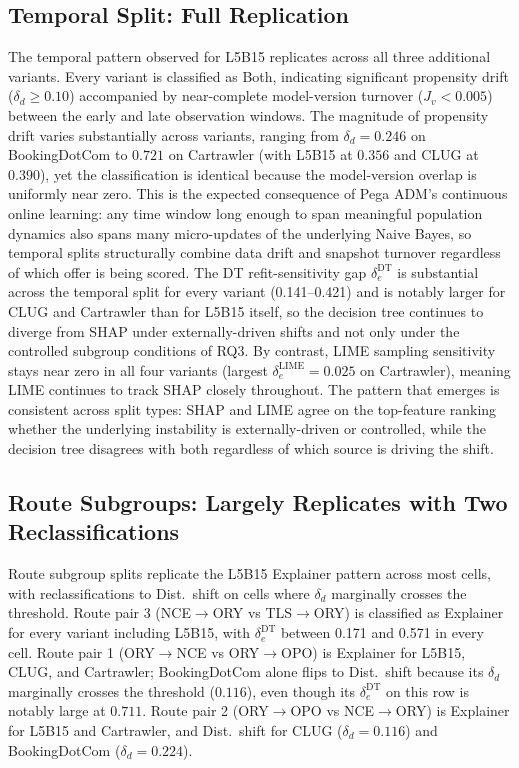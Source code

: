 \documentclass[oneside]{memoir} %
\begin{document}
\subsection{Temporal Split: Full Replication}

The temporal pattern observed for L5B15 replicates across all three additional variants. Every variant is classified as Both, indicating significant propensity drift ($\delta_d \geq 0.10$) accompanied by near-complete model-version turnover ($J_v < 0.005$) between the early and late observation windows. The magnitude of propensity drift varies substantially across variants, ranging from $\delta_d = 0.246$ on BookingDotCom to $0.721$ on Cartrawler (with L5B15 at $0.356$ and CLUG at $0.390$), yet the classification is identical because the model-version overlap is uniformly near zero. This is the expected consequence of Pega ADM's continuous online learning: any time window long enough to span meaningful population dynamics also spans many micro-updates of the underlying Naive Bayes, so temporal splits structurally combine data drift and snapshot turnover regardless of which offer is being scored. The DT refit-sensitivity gap $\delta_e^{\mathrm{DT}}$ is substantial across the temporal split for every variant (0.141--0.421) and is notably larger for CLUG and Cartrawler than for L5B15 itself, so the decision tree continues to diverge from SHAP under externally-driven shifts and not only under the controlled subgroup conditions of RQ3. By contrast, LIME sampling sensitivity stays near zero in all four variants (largest $\delta_e^{\mathrm{LIME}} = 0.025$ on Cartrawler), meaning LIME continues to track SHAP closely throughout. The pattern that emerges is consistent across split types: SHAP and LIME agree on the top-feature ranking whether the underlying instability is externally-driven or controlled, while the decision tree disagrees with both regardless of which source is driving the shift.

\subsection{Route Subgroups: Largely Replicates with Two Reclassifications}

Route subgroup splits replicate the L5B15 Explainer pattern across most cells, with reclassifications to Dist.\ shift on cells where $\delta_d$ marginally crosses the threshold. Route pair 3 (NCE$\to$ORY vs TLS$\to$ORY) is classified as Explainer for every variant including L5B15, with $\delta_e^{\mathrm{DT}}$ between 0.171 and 0.571 in every cell. Route pair 1 (ORY$\to$NCE vs ORY$\to$OPO) is Explainer for L5B15, CLUG, and Cartrawler; BookingDotCom alone flips to Dist.\ shift because its $\delta_d$ marginally crosses the threshold ($0.116$), even though its $\delta_e^{\mathrm{DT}}$ on this row is notably large at $0.711$. Route pair 2 (ORY$\to$OPO vs NCE$\to$ORY) is Explainer for L5B15 and Cartrawler, and Dist.\ shift for CLUG ($\delta_d = 0.116$) and BookingDotCom ($\delta_d = 0.224$).
\end{document}
